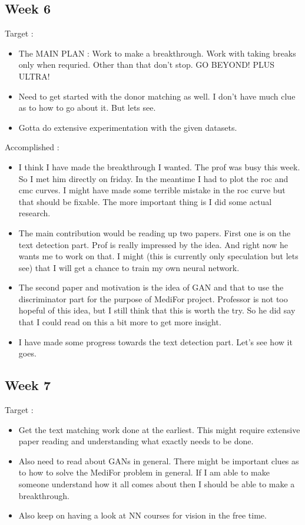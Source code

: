 \documentclass{article}
\begin{document}
\subsection{Week 6}
Target :
\begin{itemize}
\item The MAIN PLAN : Work to make a breakthrough. Work with taking breaks only when requried. Other than that don't stop. GO BEYOND! PLUS ULTRA!
\item Need to get started with the donor matching as well. I don't have much clue as to how to go about it. But lets see.
\item Gotta do extensive experimentation with the given datasets.
\end{itemize}

Accomplished :
\begin{itemize}
\item I think I have made the breakthrough I wanted. The prof was busy this week. So I met him directly on friday. In the meantime I had to plot the roc and cmc curves. I might have made some terrible mistake in the roc curve but that should be fixable. The more important thing is I did some actual research.
\item The main contribution would be reading up two papers. First one is on the text detection part. Prof is really impressed by the idea. And right now he wants me to work on that. I might (this is currently only speculation but lets see) that I will get a chance to train my own neural network.
\item The second paper and motivation is the idea of GAN and that to use the discriminator part for the purpose of MediFor project. Professor is not too hopeful of this idea, but I still think that this is worth the try. So he did say that I could read on this a bit more to get more insight.
\item I have made some progress towards the text detection part. Let's see how it goes.
\end{itemize}

\subsection{Week 7}
Target :
\begin{itemize}
\item Get the text matching work done at the earliest. This might require extensive paper reading and understanding what exactly needs to be done.
\item Also need to read about GANs in general. There might be important clues as to how to solve the MediFor problem in general. If I am able to make someone understand how it all comes about then I should be able to make a breakthrough.
\item Also keep on having a look at NN courses for vision in the free time.
\end{itemize}
\end{document}
